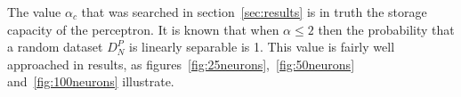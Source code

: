 The value $\alpha_c$ that was searched in section~\ref{sec:results} is in truth the storage capacity of the perceptron. 
It is known that when $\alpha \leq 2$ then the probability that a random dataset $D_N^P$ is linearly separable is 1. 
This value is fairly well approached in results, as figures~\ref{fig:25neurons},~\ref{fig:50neurons} and~\ref{fig:100neurons} illustrate.